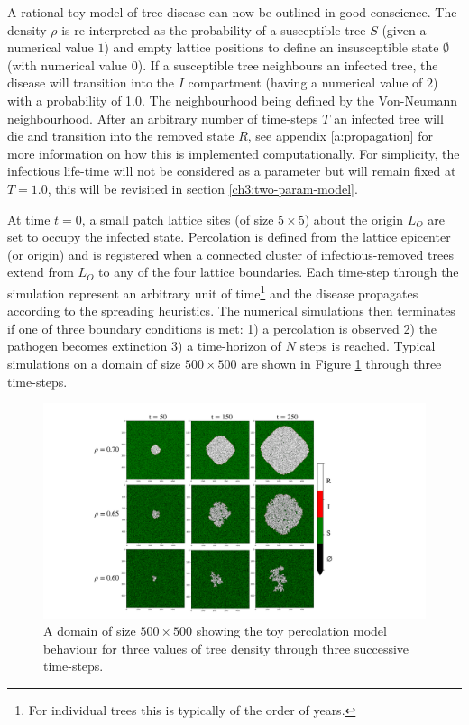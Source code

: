 A rational toy model of tree disease can now be outlined in good conscience. %
The density $\rho$ is re-interpreted as the probability of a susceptible tree $S$ (given a numerical value $1$) and empty lattice positions to define an insusceptible state $\emptyset$ (with numerical value $0$). %
If a susceptible tree neighbours an infected tree, the disease  will transition into the $I$ compartment (having a numerical value of $2$) with a probability of 1.0. %
The neighbourhood being defined by the Von-Neumann neighbourhood. %
After an arbitrary number of time-steps $T$ an infected tree will die and transition into the removed state $R$, see appendix \ref{a:propagation} for more information on how this is implemented computationally. %
For simplicity, the infectious life-time will not be considered as a parameter but will remain fixed at $T=1.0$, %
this will be revisited in section \ref{ch3:two-param-model}.

At time $t=0$, a small patch lattice sites (of size $5\times5$) about the origin $L_O$ are set to occupy the infected state. %
Percolation is defined from the lattice epicenter (or origin) and is registered when a connected cluster of infectious-removed trees extend from $L_O$ to any of the four lattice boundaries. %
Each time-step through the simulation represent an arbitrary unit of time\footnote{For individual trees this is typically of the order of years.} %
and the disease propagates according to the spreading heuristics. %
The numerical simulations then terminates if one of three boundary conditions is met: %
1) a percolation is observed %
2) the pathogen becomes extinction %
3) a time-horizon of $N$ steps is reached. %
Typical simulations on a domain of size $500 \times 500$ are shown in Figure \ref{fig:ch3-perc-spread} through three time-steps. %

\begin{figure}
    \centering
    \includegraphics[scale=0.40]{chapter3/figures/figure1.pdf}
    \caption{A domain of size $\mathrm{500\times 500}$ showing the toy percolation model behaviour for three values of tree density through three successive time-steps.}
    \label{fig:ch3-perc-spread}
\end{figure}

